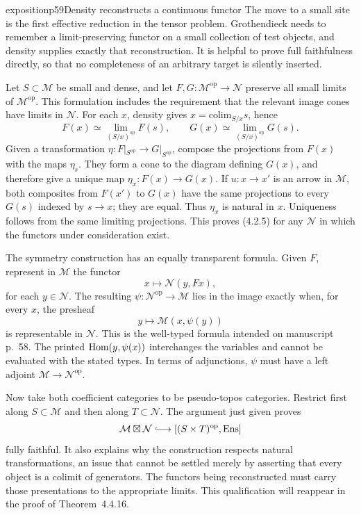 \begin{dcomment}{exposition}{p59}{Density reconstructs a continuous functor}
The move to a small site is the first effective reduction in the tensor problem. Grothendieck needs to remember a limit-preserving functor on a small collection of test objects, and density supplies exactly that reconstruction. It is helpful to prove full faithfulness directly, so that no completeness of an arbitrary target is silently inserted.

Let $S\subset\mathcal M$ be small and dense, and let $F,G:\mathcal M^{\mathrm{op}}\to\mathcal N$ preserve all small limits of $\mathcal M^{\mathrm{op}}$. This formulation includes the requirement that the relevant image cones have limits in $\mathcal N$. For each $x$, density gives $x=\mathrm{colim}_{S/x}s$, hence
\[
 F(x)\simeq\lim_{(S/x)^{\mathrm{op}}}F(s),\qquad
 G(x)\simeq\lim_{(S/x)^{\mathrm{op}}}G(s).
\]
Given a transformation $\eta:F|_{S^{\mathrm{op}}}\to G|_{S^{\mathrm{op}}}$, compose the projections from $F(x)$ with the maps $\eta_s$. They form a cone to the diagram defining $G(x)$, and therefore give a unique map $\eta_x:F(x)\to G(x)$. If $u:x\to x'$ is an arrow in $\mathcal M$, both composites from $F(x')$ to $G(x)$ have the same projections to every $G(s)$ indexed by $s\to x$; they are equal. Thus $\eta_x$ is natural in $x$. Uniqueness follows from the same limiting projections. This proves (4.2.5) for any $\mathcal N$ in which the functors under consideration exist.

The symmetry construction has an equally transparent formula. Given $F$, represent in $\mathcal M$ the functor
\[
 x\longmapsto\mathcal N(y,Fx),
\]
for each $y\in\mathcal N$. The resulting $\psi:\mathcal N^{\mathrm{op}}\to\mathcal M$ lies in the image exactly when, for every $x$, the presheaf
\[
 y\longmapsto\mathcal M(x,\psi(y))
\]
is representable in $\mathcal N$. This is the well-typed formula intended on manuscript p.~58. The printed $\mathrm{Hom}(y,\psi(x))$ interchanges the variables and cannot be evaluated with the stated types. In terms of adjunctions, $\psi$ must have a left adjoint $\mathcal M\to\mathcal N^{\mathrm{op}}$.

Now take both coefficient categories to be pseudo-topos categories. Restrict first along $S\subset\mathcal M$ and then along $T\subset\mathcal N$. The argument just given proves
\[
 \mathcal M\boxtimes\mathcal N\lhook\joinrel\longrightarrow
 [(S\times T)^{\mathrm{op}},\Ens]
\]
fully faithful. It also explains why the construction respects natural transformations, an issue that cannot be settled merely by asserting that every object is a colimit of generators. The functors being reconstructed must carry those presentations to the appropriate limits. This qualification will reappear in the proof of Theorem~4.4.16.
\end{dcomment}


